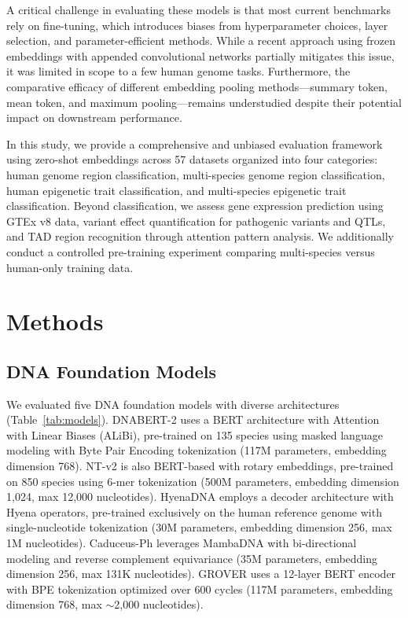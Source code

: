 \documentclass[11pt]{article}
\begin{document}
A critical challenge in evaluating these models is that most current benchmarks rely on fine-tuning, which introduces biases from hyperparameter choices, layer selection, and parameter-efficient methods. While a recent approach using frozen embeddings with appended convolutional networks partially mitigates this issue, it was limited in scope to a few human genome tasks. Furthermore, the comparative efficacy of different embedding pooling methods---summary token, mean token, and maximum pooling---remains understudied despite their potential impact on downstream performance.

In this study, we provide a comprehensive and unbiased evaluation framework using zero-shot embeddings across 57 datasets organized into four categories: human genome region classification, multi-species genome region classification, human epigenetic trait classification, and multi-species epigenetic trait classification. Beyond classification, we assess gene expression prediction using GTEx v8 data, variant effect quantification for pathogenic variants and QTLs, and TAD region recognition through attention pattern analysis. We additionally conduct a controlled pre-training experiment comparing multi-species versus human-only training data.

\section{Methods}

\subsection{DNA Foundation Models}

We evaluated five DNA foundation models with diverse architectures (Table~\ref{tab:models}). DNABERT-2 uses a BERT architecture with Attention with Linear Biases (ALiBi), pre-trained on 135 species using masked language modeling with Byte Pair Encoding tokenization (117M parameters, embedding dimension 768). NT-v2 is also BERT-based with rotary embeddings, pre-trained on 850 species using 6-mer tokenization (500M parameters, embedding dimension 1,024, max 12,000 nucleotides). HyenaDNA employs a decoder architecture with Hyena operators, pre-trained exclusively on the human reference genome with single-nucleotide tokenization (30M parameters, embedding dimension 256, max 1M nucleotides). Caduceus-Ph leverages MambaDNA with bi-directional modeling and reverse complement equivariance (35M parameters, embedding dimension 256, max 131K nucleotides). GROVER uses a 12-layer BERT encoder with BPE tokenization optimized over 600 cycles (117M parameters, embedding dimension 768, max $\sim$2,000 nucleotides).
\end{document}
